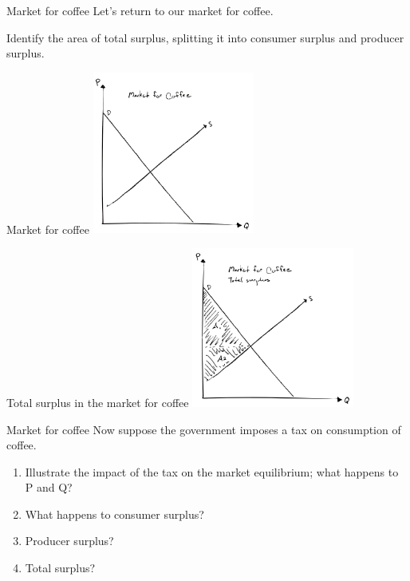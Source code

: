 \documentclass[aspectratio=169]{beamer}
\begin{document}
\begin{frame}{Market for coffee}
    Let's return to our market for coffee.

    \vspace{5mm}

    Identify the area of total surplus, splitting it into consumer surplus and producer surplus.
\end{frame}

\begin{frame}{Market for coffee}
    \centering
    \includegraphics[width = 0.4\textwidth,keepaspectratio]{../figs/coffee1.png}
\end{frame}

\begin{frame}{Total surplus in the market for coffee}
    \centering
    \includegraphics[width = 0.4\textwidth,keepaspectratio]{../figs/coffee2.png}
\end{frame}

\begin{frame}{Market for coffee}
    Now suppose the government imposes a tax on consumption of coffee.

    \vspace{2mm}

    \begin{enumerate}
        \item Illustrate the impact of the tax on the market equilibrium; what happens to P and Q?
        \item What happens to consumer surplus?
        \item Producer surplus?
        \item Total surplus?
    \end{enumerate}
\end{frame}
\end{document}
